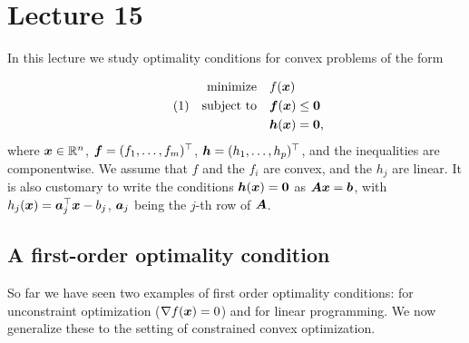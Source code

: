 %
%
% 


\chapter*{Lecture 15}
\addtocounter{chapter}{15}
\addtocounter{section}{0}


In this lecture we study optimality conditions for convex problems of the form

\begin{align*}\label{eq:constr}\tag{1}
\begin{split}
 \text{minimize}\quad & f(\bm{x})\\
 \quad\text{subject to}\quad & \bm{f}(\bm{x})\leq \bm{0}\\
         & \bm{h}(\bm{x})= \bm{0},
\end{split}
\end{align*}
where $\bm{x}\in \mathbb{R}^n$, $\bm{f}=(f_1,\dots,f_m)^{\top}$, $\bm{h}=(h_1,\dots,h_p)^{\top}$, and the inequalities are componentwise. We assume that $f$ and the $f_i$ are convex, and the $h_j$ are linear. It is also customary to write the conditions $\bm{h}(\bm{x})=\bm{0}$ as $\bm{A}\bm{x}=\bm{b}$, with $h_j(\bm{x}) = \bm{a}_j^{\top}\bm{x}-b_j$, $\bm{a}_j$ being the $j$-th row of $\bm{A}$.

\section{A first-order optimality condition}
So far we have seen two examples of first order optimality conditions: for unconstraint optimization ($\nabla f(\bm{x})=0$) and for linear programming. We now generalize these to the setting of constrained convex optimization.

